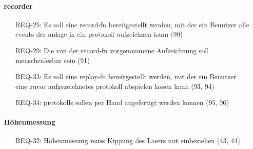 \paragraph{\gls{recorder}}
\begin{itemize}
    \item[REQ-25:] Es soll eine \gls{record-fn} bereitgestellt werden, mit der ein Benutzer alle
    \glspl{event} der \gls{anlage} in ein \gls{protokoll} aufzeichnen kann (90)
    \item[REQ-29:] Die von der \gls{record-fn} vorgenommene Aufzeichnung soll menschenlesbar sein (91)
    \item[REQ-33:] Es soll eine \gls{replay-fn} bereitgestellt werden, mit der ein
    Benutzer eine zuvor aufgezeichnetes \gls{protokoll} abspielen lassen kann (93, 94)
    \item[REQ-34:] \glspl{protokoll} sollen per Hand angefertigt werden können (95, 96)
\end{itemize}

\paragraph{Höhenmessung}
\begin{itemize}
    \item[REQ-32:] Höhenmessung muss Kippung des Lasers mit einbeziehen (43, 44)
\end{itemize}

